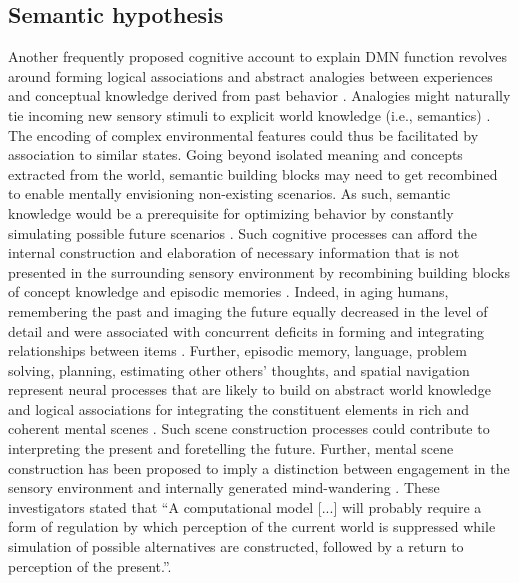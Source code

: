 \documentclass[10pt,letterpaper]{article}
\begin{document}
\subsection{Semantic hypothesis}
Another frequently proposed cognitive account to explain DMN function revolves
around forming logical associations and abstract analogies between
experiences and conceptual knowledge derived from past behavior
\citep{bar2007proactive, binder1999conceptual, constantinescu2016organizing}.
Analogies might naturally tie incoming new sensory stimuli to
explicit world knowledge (i.e., semantics)
\citep{bar2009proactive}.
The encoding of complex environmental features could thus be facilitated
by association to similar states.
%
Going beyond isolated meaning and concepts extracted from the world,
semantic building blocks may need to get recombined to enable
mentally envisioning non-existing scenarios.
As such, semantic knowledge would be a prerequisite for optimizing behavior
by constantly simulating possible future scenarios
\citep{boyer2008evolutionary, binder2011neurobiology}.
Such cognitive processes can afford
the internal construction and elaboration of necessary information
that is not presented in the surrounding sensory environment
by recombining building blocks of
concept knowledge and episodic memories
\citep{hassabis2009construction}.
Indeed, in aging humans, remembering the past and imaging the future
equally decreased in the level of detail and were associated with
concurrent deficits in forming and integrating relationships between
items \citep{addis2008age, spreng2006temporal}.
Further,
episodic memory, language, problem solving,
planning, estimating other others' thoughts, and spatial navigation
represent neural processes that are likely to
build on abstract world knowledge and logical associations
for integrating the constituent elements in rich and coherent mental scenes
\citep{schacter2007remembering}.
Such scene construction processes could contribute to interpreting the
present and foretelling the future.
Further,
mental scene construction has been proposed
to imply a distinction between
engagement in the sensory environment
and internally generated mind-wandering
\citep{buckner2007self}.
These investigators stated that
``A computational model [...] will probably require a form of
regulation by which perception of the current world is suppressed
while simulation of possible alternatives are constructed,
followed by a return to perception of the present.''.
\end{document}
